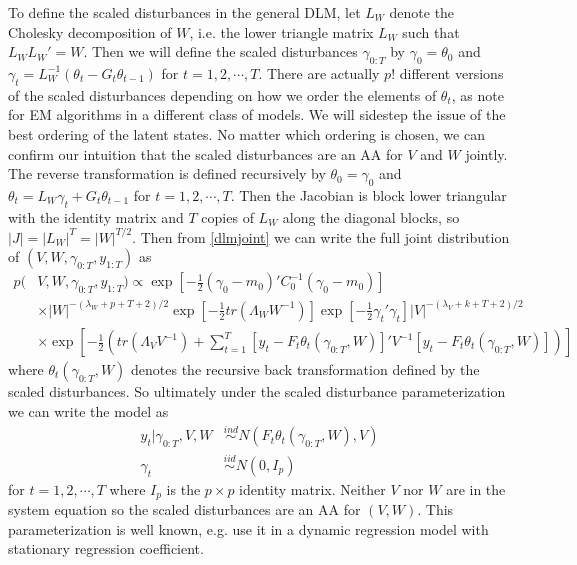 \documentclass{article}
\begin{document}
To define the scaled disturbances in the general DLM, let $L_W$ denote the Cholesky decomposition of $W$, i.e. the lower triangle matrix $L_W$ such that $L_WL_W' =W$. Then we will define the scaled disturbances $\gamma_{0:T}$ by $\gamma_0=\theta_0$ and $\gamma_t = L_W^{-1}(\theta_t-G_t\theta_{t-1})$ for $t=1,2,\cdots,T$. There are actually $p!$ different versions of the scaled disturbances depending on how we order the elements of $\theta_t$, as  note for EM algorithms in a different class of models. We will sidestep the issue of the best ordering of the latent states. No matter which ordering is chosen, we can confirm our intuition that the scaled disturbances are an AA for $V$ and $W$ jointly. The reverse transformation is defined recursively by $\theta_0=\gamma_0$ and $\theta_t=L_W\gamma_t + G_t\theta_{t-1}$ for $t=1,2,\cdots,T$. Then the Jacobian is block lower triangular with the identity matrix and $T$ copies of $L_W$ along the diagonal blocks, so $|J| = |L_W|^T=|W|^{T/2}$. Then from \eqref{dlmjoint} we can write the full joint distribution of $(V,W,\gamma_{0:T},y_{1:T})$ as
 \begin{align}
  p(&V,W,\gamma_{0:T},y_{1:T}) \propto \exp\left[-\frac{1}{2}(\gamma_0-m_0)'C_0^{-1}(\gamma_0-m_0)\right] \nonumber\\
  &\times |W|^{-(\lambda_W + p + T + 2)/2}\exp\left[-\frac{1}{2}tr\left(\Lambda_WW^{-1}\right)\right] \exp\left[-\frac{1}{2}\gamma_t'\gamma_t\right] |V|^{-(\lambda_V + k + T + 2)/2} \nonumber\\
  &\times \exp\left[-\frac{1}{2}\left(tr\left(\Lambda_VV^{-1}\right) + \sum_{t=1}^T\left[y_t-F_t\theta_t(\gamma_{0:T},W)\right]'V^{-1}\left[y_t-F_t\theta_t(\gamma_{0:T},W)\right]\right)\right] \label{dlmdistjoint}
 \end{align}
where $\theta_t(\gamma_{0:T},W)$ denotes the recursive back transformation defined by the scaled disturbances. So ultimately under the scaled disturbance parameterization we can write the model as
\begin{align}
  y_t|\gamma_{0:T},V,W & \stackrel{ind}{\sim} N\left(F_t\theta_t(\gamma_{0:T},W), V\right)\nonumber\\
  \gamma_t & \stackrel{iid}{\sim}N(0,I_p) \label{dlmdistmodel}
\end{align}
for $t=1,2,\cdots,T$ where $I_p$ is the $p\times p$ identity matrix. Neither $V$ nor $W$ are in the system equation so the scaled disturbances are an AA for $(V,W)$. This parameterization is well known, e.g.  use it in a dynamic regression model with stationary regression coefficient. 
\end{document}
